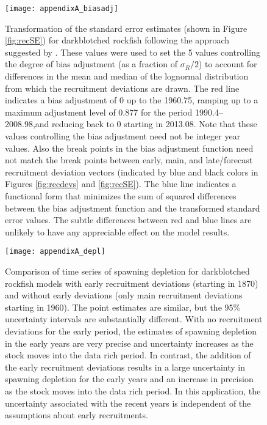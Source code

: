 \begin{figure}[H]
	\begin{center}
	\texttt{[image: appendixA\_biasadj]}\\
	\end{center}
	\caption{Transformation of the standard error estimates (shown in Figure \ref{fig:recSE}) for darkblotched rockfish following the approach suggested by \citet{methot-adjusting-2011}. These values were used to set the 5 values controlling the degree of bias adjustment (as a fraction of  $\sigma_R/2$) to account for differences in the mean and median of the lognormal distribution from which the recruitment deviations are drawn. The red line indicates a bias adjustment of 0 up to the  1960.75, ramping up to a maximum adjustment level of 0.877 for the period 1990.4--2008.98,and reducing back to 0 starting in 2013.08. Note that these values controlling the bias adjustment need not be integer year values. Also the break points in the bias adjustment function need not match the break points between early, main, and late/forecast recruitment deviation vectors (indicated by blue and black colors in Figures \ref{fig:recdevs} and \ref{fig:recSE}). The blue line indicates a functional form that minimizes the sum of squared differences between the bias adjustment function and the transformed standard error values. The subtle differences between red and blue lines are unlikely to have any appreciable effect on the model results.}
	\label{fig:ramp}
\end{figure}


\begin{figure}[H]
	\begin{center}
	\texttt{[image: appendixA\_depl]}\\
	\end{center}
	\caption{Comparison of time series of spawning depletion for darkblotched rockfish models with early recruitment deviations (starting in 1870) and without early deviations (only main recruitment deviations starting in 1960). The point estimates are similar, but the 95\% uncertainty intervals are substantially different. With no recruitment deviations for the early period, the estimates of spawning depletion in the early years are very precise and uncertainty increases as the stock moves into the data rich period. In contrast, the addition of the early recruitment deviations results in a large uncertainty in spawning depletion for the early years and an increase in precision as the stock moves into the data rich period. In this application, the uncertainty associated with the recent years is independent of the assumptions about early recruitments.}
	\label{fig:depl}
\end{figure}

